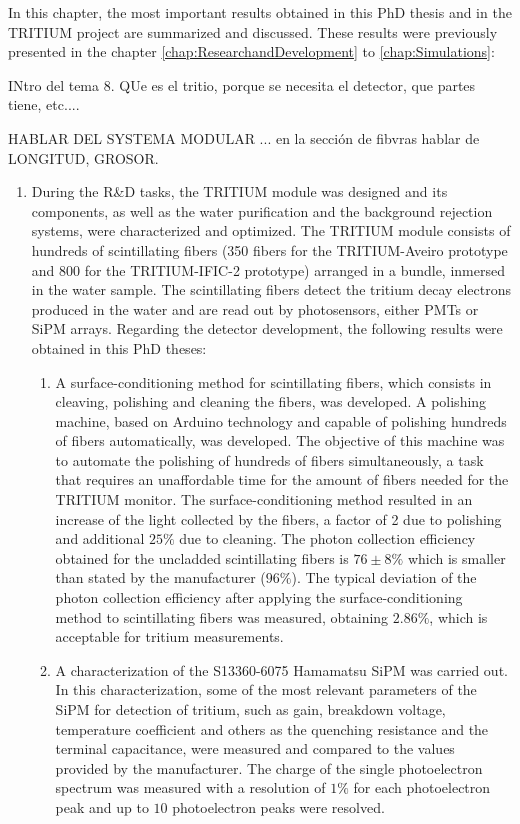 In this chapter, the most important results obtained in this PhD thesis and in the TRITIUM project are summarized and discussed. These results were previously presented in the chapter \ref{chap:ResearchandDevelopment} to \ref{chap:Simulations}:

INtro del tema 8. QUe es el tritio, porque se necesita el detector, que partes tiene, etc....

HABLAR DEL SYSTEMA MODULAR ... en la sección de fibvras hablar de LONGITUD, GROSOR.

\begin{enumerate}
\item{} During the R\&D tasks, the TRITIUM module was designed and its components, as well as the water purification and the background rejection systems, were characterized and optimized. The TRITIUM module consists of hundreds of scintillating fibers (350 fibers for the TRITIUM-Aveiro prototype and 800 for the TRITIUM-IFIC-2 prototype) arranged in a bundle, inmersed in the water sample. The scintillating fibers detect the tritium decay electrons produced in the water and are read out by photosensors, either PMTs or SiPM arrays. Regarding the detector development, the following results were obtained in this PhD theses:

\begin{enumerate}
\item{} A surface-conditioning method for scintillating fibers, which consists in cleaving, polishing and cleaning the fibers, was developed. A polishing machine, based on Arduino technology and capable of polishing hundreds of fibers automatically, was developed. The objective of this machine was to automate the polishing of hundreds of fibers simultaneously, a task that requires an unaffordable time for the amount of fibers needed for the TRITIUM monitor. The surface-conditioning method resulted in an increase of the light collected by the fibers, a factor of 2 due to polishing and additional $25\%$ due to cleaning. The photon collection efficiency obtained for the uncladded scintillating fibers is $76\pm 8\%$ which is smaller than stated by the manufacturer ($96\%$). The typical deviation of the photon collection efficiency after applying the surface-conditioning method to scintillating fibers was measured, obtaining $2.86\%$, which is acceptable for tritium measurements.

\item{} A characterization of the S13360-6075 Hamamatsu SiPM was carried out. In this characterization, some of the most relevant parameters of the SiPM for detection of tritium, such as gain, breakdown voltage, temperature coefficient and others as the quenching resistance and the terminal capacitance, were measured and compared to the values provided by the manufacturer. The charge of the single photoelectron spectrum was measured with a resolution of $1\%$ for each photoelectron peak and up to $10$ photoelectron peaks were resolved. %


\end{enumerate}
\end{enumerate}
